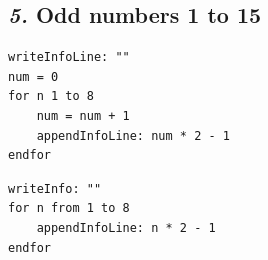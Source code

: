 \documentclass[12pt, english]{article}
\begin{document}
\subsection*{\emph{5.} Odd numbers 1 to 15}

\begin{lstlisting}
writeInfoLine: ""
num = 0
for n 1 to 8
    num = num + 1
    appendInfoLine: num * 2 - 1
endfor
\end{lstlisting}

\begin{lstlisting}[rulesepcolor=\color{blue}]
writeInfo: ""
for n from 1 to 8
    appendInfoLine: n * 2 - 1
endfor
\end{lstlisting}

\vspace{10pt}

\end{document}
